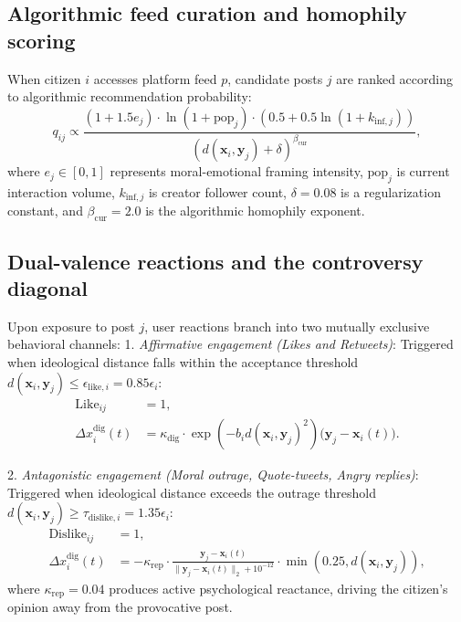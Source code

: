 \documentclass[11pt,a4paper]{article}
\begin{document}
\subsection{Algorithmic feed curation and homophily scoring}
\label{sssec:feed_scoring}
When citizen $i$ accesses platform feed $p$, candidate posts $j$ are ranked according to algorithmic recommendation probability:
\begin{equation}
    q_{ij} \propto \frac{(1 + 1.5 e_j) \cdot \ln(1 + \mathrm{pop}_j) \cdot (0.5 + 0.5\ln(1 + k_{\mathrm{inf}, j}))}{(d(\mathbf{x}_i, \mathbf{y}_j) + \delta)^{\beta_{\mathrm{cur}}}},
    \label{eq:feed_recommendation_score}
\end{equation}
where $e_j \in [0, 1]$ represents moral-emotional framing intensity, $\mathrm{pop}_j$ is current interaction volume, $k_{\mathrm{inf}, j}$ is creator follower count, $\delta = 0.08$ is a regularization constant, and $\beta_{\mathrm{cur}} = 2.0$ is the algorithmic homophily exponent.

\subsection{Dual-valence reactions and the controversy diagonal}
\label{sssec:dual_valence_mechanics}
Upon exposure to post $j$, user reactions branch into two mutually exclusive behavioral channels:
1. \emph{Affirmative engagement (Likes and Retweets)}: Triggered when ideological distance falls within the acceptance threshold $d(\mathbf{x}_i, \mathbf{y}_j) \le \epsilon_{\mathrm{like}, i} = 0.85 \epsilon_i$:
\begin{align}
    \mathrm{Like}_{ij} &= 1, \label{eq:like_trigger} \\
    \Delta x_i^{\text{dig}}(t) &= \kappa_{\mathrm{dig}} \cdot \exp\!\left(-b_i d(\mathbf{x}_i, \mathbf{y}_j)^2\right) \big(\mathbf{y}_j - \mathbf{x}_i(t)\big). \label{eq:like_assimilation}
\end{align}

2. \emph{Antagonistic engagement (Moral outrage, Quote-tweets, Angry replies)}: Triggered when ideological distance exceeds the outrage threshold $d(\mathbf{x}_i, \mathbf{y}_j) \ge \tau_{\mathrm{dislike}, i} = 1.35 \epsilon_i$:
\begin{align}
    \mathrm{Dislike}_{ij} &= 1, \label{eq:dislike_trigger} \\
    \Delta x_i^{\text{dig}}(t) &= -\kappa_{\mathrm{rep}} \cdot \frac{\mathbf{y}_j - \mathbf{x}_i(t)}{\|\mathbf{y}_j - \mathbf{x}_i(t)\|_2 + 10^{-12}} \cdot \min(0.25, d(\mathbf{x}_i, \mathbf{y}_j)), \label{eq:dislike_repulsion}
\end{align}
where $\kappa_{\mathrm{rep}} = 0.04$ produces active psychological reactance, driving the citizen's opinion away from the provocative post.
\end{document}
